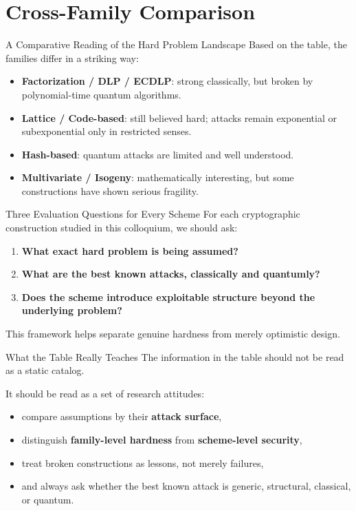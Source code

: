 \documentclass[aspectratio=169]{beamer}
\begin{document}
	\section{Cross-Family Comparison}
	
	\begin{frame}{A Comparative Reading of the Hard Problem Landscape}
		Based on the table, the families differ in a striking way:
		
		\vspace{0.5em}
		\begin{itemize}
			\item \textbf{Factorization / DLP / ECDLP}: strong classically, but broken by polynomial-time quantum algorithms.
			\item \textbf{Lattice / Code-based}: still believed hard; attacks remain exponential or subexponential only in restricted senses.
			\item \textbf{Hash-based}: quantum attacks are limited and well understood.
			\item \textbf{Multivariate / Isogeny}: mathematically interesting, but some constructions have shown serious fragility.
		\end{itemize}
	\end{frame}
	
	\begin{frame}{Three Evaluation Questions for Every Scheme}
		For each cryptographic construction studied in this colloquium, we should ask:
		
		\begin{enumerate}
			\item \textbf{What exact hard problem is being assumed?}
			\item \textbf{What are the best known attacks, classically and quantumly?}
			\item \textbf{Does the scheme introduce exploitable structure beyond the underlying problem?}
		\end{enumerate}
		
		\vspace{0.75em}
		This framework helps separate genuine hardness from merely optimistic design.
	\end{frame}
	
	\begin{frame}{What the Table Really Teaches}
		The information in the table should not be read as a static catalog.
		
		\vspace{0.5em}
		It should be read as a set of research attitudes:
		\begin{itemize}
			\item compare assumptions by their \textbf{attack surface},
			\item distinguish \textbf{family-level hardness} from \textbf{scheme-level security},
			\item treat broken constructions as lessons, not merely failures,
			\item and always ask whether the best known attack is generic, structural, classical, or quantum.
		\end{itemize}
	\end{frame}
	
\end{document}
